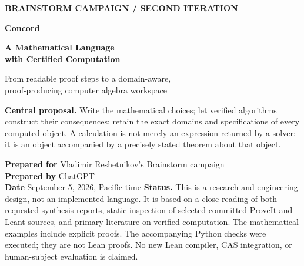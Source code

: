 \documentclass[11pt,a4paper]{article}
\theoremstyle{remark}
\begin{document}
\begin{titlepage}
\vspace*{10mm}
{\small\sffamily\bfseries\color{accent}BRAINSTORM CAMPAIGN \quad / \quad SECOND ITERATION\par}
\vspace{13mm}
{\fontsize{35}{40}\selectfont\bfseries\color{ink}Concord\par}
\vspace{4mm}
{\LARGE\bfseries A Mathematical Language\\with Certified Computation\par}
\vspace{9mm}
{\large From readable proof steps to a domain-aware,\\proof-producing computer algebra workspace\par}
\vspace{11mm}
\begin{decisionbox}
\textbf{Central proposal.} Write the mathematical choices; let verified algorithms
construct their consequences; retain the exact domains and specifications of every
computed object. A calculation is not merely an expression returned by a solver:
it is an object accompanied by a precisely stated theorem about that object.
\end{decisionbox}
\vspace{8mm}
\textbf{Prepared for} Vladimir Reshetnikov's Brainstorm campaign\\
\textbf{Prepared by} ChatGPT\\
\textbf{Date} September 5, 2026, Pacific time
\vfill
\small
\textbf{Status.} This is a research and engineering design, not an implemented
language. It is based on a close reading of both requested synthesis reports,
static inspection of selected committed ProveIt and Leant sources, and primary
literature on verified computation. The mathematical examples include explicit
proofs. The accompanying Python checks were executed; they are not Lean proofs.
No new Lean compiler, CAS integration, or human-subject evaluation is claimed.
\end{titlepage}
\end{document}
